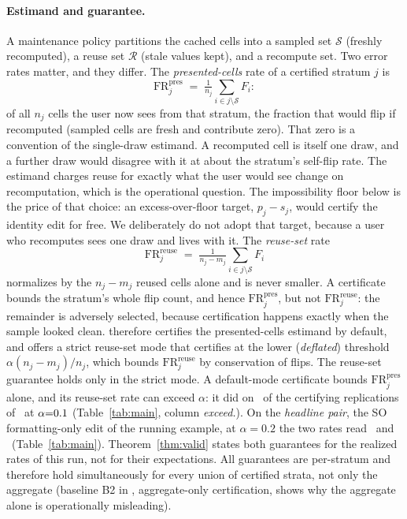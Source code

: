 \keeprunin
\paragraph{Estimand and guarantee.} A maintenance policy partitions the
cached cells into a sampled set $\mathcal{S}$ (freshly recomputed), a
reuse set $\mathcal{R}$ (stale values kept), and a recompute set. Two
error rates matter, and they differ. The \emph{presented-cells} rate of
a certified stratum $j$ is
\[
  \mathrm{FR}^{\mathrm{pres}}_j \;=\; \tfrac{1}{n_j}
  \textstyle\sum_{i \in j \setminus \mathcal{S}} F_i :
\]
of all $n_j$ cells the user now sees from that stratum, the fraction
that would flip if recomputed (sampled cells are fresh and contribute
zero). That zero is a convention of the single-draw estimand. A
recomputed cell is itself one draw, and a further draw would disagree
with it at about the stratum's self-flip rate. The estimand charges
reuse for exactly what the user would see change on recomputation,
which is the operational question. The impossibility floor below is the
price of that choice: an excess-over-floor target, $p_j - s_j$, would
certify the identity edit for free. We deliberately do not adopt that
target, because a user who recomputes sees one draw and lives with it.
The \emph{reuse-set} rate
\[
  \mathrm{FR}^{\mathrm{reuse}}_j \;=\; \tfrac{1}{n_j - m_j}
  \textstyle\sum_{i \in j\setminus\mathcal{S}} F_i
\]
normalizes by the $n_j{-}m_j$ reused cells alone and is never
smaller. A certificate bounds the stratum's whole flip count, and hence
$\mathrm{FR}^{\mathrm{pres}}_j$, but not $\mathrm{FR}^{\mathrm{reuse}}_j$:
the remainder is adversely selected, because certification happens
exactly when the sample looked clean. \sivm{} therefore
certifies the presented-cells estimand by default, and offers a strict
reuse-set mode that certifies at the lower (\emph{deflated}) threshold
$\alpha (n_j - m_j)/n_j$, which bounds $\mathrm{FR}^{\mathrm{reuse}}_j$
by conservation of flips. The reuse-set guarantee holds only in the
strict mode. A default-mode certificate bounds
$\mathrm{FR}^{\mathrm{pres}}_j$ alone, and its reuse-set rate can exceed
$\alpha$: it did on \tableExceedMaxSafe\ of the certifying replications
of \tableExceedMaxSafePair\ at $\alpha{=}0.1$
(Table~\ref{tab:main}, column \emph{exceed.}). On the \emph{headline pair}, the SO
formatting-only edit of the running example, at $\alpha{=}0.2$ the two
rates read \benchRealized\ and \benchRealizedReuse\
(Table~\ref{tab:main}). Theorem~\ref{thm:valid} states both
guarantees for the realized rates of this run, not for their
expectations. All guarantees are per-stratum and therefore
hold simultaneously for every union of certified strata, not only the
aggregate (baseline B2 in \secref{sec:exp-baselines}, aggregate-only
certification, shows why the aggregate alone is operationally
misleading).

